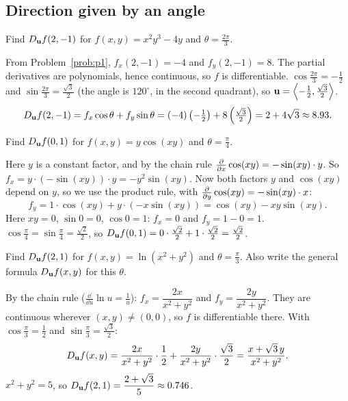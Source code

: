 \subsection{Direction given by an angle}

\begin{problem}\label{prob:p3}
Find $D_{\mathbf{u}} f(2,-1)$ for $f(x,y)=x^2y^3-4y$ and $\theta=\frac{2\pi}{3}$.
\end{problem}
\begin{solution}
 From Problem~\ref{prob:p1}, $f_x(2,-1)=-4$ and $f_y(2,-1)=8$. The
partial derivatives are polynomials, hence continuous, so $f$ is differentiable.
 $\cos\frac{2\pi}{3}=-\frac12$ and $\sin\frac{2\pi}{3}=\frac{\sqrt3}{2}$ (the angle is
$120^\circ$, in the second quadrant), so $\mathbf{u}=\left\langle -\frac12,\frac{\sqrt3}{2} \right\rangle$.
\[
  D_{\mathbf{u}} f(2,-1)=f_x\cos\theta+f_y\sin\theta=(-4)\left(-\tfrac12\right)+8\left(\tfrac{\sqrt3}{2}\right)=2+4\sqrt3\approx8.93 .
\]
\end{solution}

\begin{problem}\label{prob:p4}
Find $D_{\mathbf{u}} f(0,1)$ for $f(x,y)=y\cos(xy)$ and $\theta=\frac\pi4$.
\end{problem}
\begin{solution}
 Here $y$ is a constant factor, and by the chain rule
$\frac{\partial }{\partial x}\cos(xy)=-\sin(xy)\cdot y$. So $f_x=y\cdot(-\sin(xy))\cdot y=-y^2\sin(xy)$.
 Now both factors $y$ and $\cos(xy)$ depend on $y$, so we use the product rule,
with $\frac{\partial }{\partial y}\cos(xy)=-\sin(xy)\cdot x$:
\[
  f_y=1\cdot\cos(xy)+y\cdot\left(-x\sin(xy)\right)=\cos(xy)-xy\sin(xy).
\]
 Here $xy=0$, $\sin0=0$, $\cos0=1$: $f_x=0$ and $f_y=1-0=1$.
 $\cos\frac\pi4=\sin\frac\pi4=\frac{\sqrt2}{2}$, so
$D_{\mathbf{u}} f(0,1)=0\cdot\frac{\sqrt2}{2}+1\cdot\frac{\sqrt2}{2}=\frac{\sqrt2}{2}$.
\end{solution}

\begin{problem}\label{prob:p5}
Find $D_{\mathbf{u}} f(2,1)$ for $f(x,y)=\ln(x^2+y^2)$ and $\theta=\frac\pi3$. Also write the
general formula $D_{\mathbf{u}} f(x,y)$ for this $\theta$.
\end{problem}
\begin{solution}
 By the chain rule ($\frac{\dd}{\dd u}\ln u=\frac1u$):
$f_x=\dfrac{2x}{x^2+y^2}$ and $f_y=\dfrac{2y}{x^2+y^2}$. They are continuous wherever
$(x,y)\neq(0,0)$, so $f$ is differentiable there.
 With $\cos\frac\pi3=\frac12$ and $\sin\frac\pi3=\frac{\sqrt3}{2}$:
\[
  D_{\mathbf{u}} f(x,y)=\frac{2x}{x^2+y^2}\cdot\frac12+\frac{2y}{x^2+y^2}\cdot\frac{\sqrt3}{2}=\frac{x+\sqrt3\,y}{x^2+y^2}.
\]
 $x^2+y^2=5$, so $D_{\mathbf{u}} f(2,1)=\dfrac{2+\sqrt3}{5}\approx0.746$.
\end{solution}

